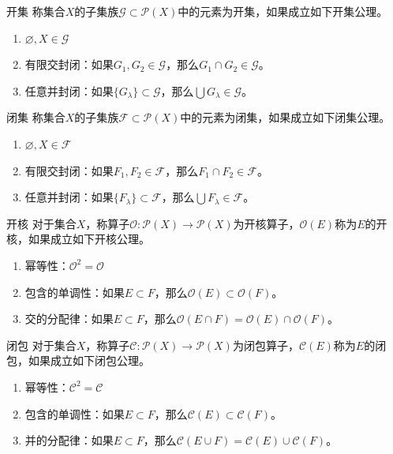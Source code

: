 \documentclass[lang = cn, scheme = chinese, thmcnt = section, usesamecnt]{elegantbook}
\newcommand{\sub}{\subset}             %
\begin{document}
\begin{definition}{开集}
	称集合$X$的子集族$\mathscr{G}\sub\mathscr{P}(X)$中的元素为开集，如果成立如下开集公理。
	\begin{enumerate}
		\item $\varnothing,X\in\mathscr{G}$
		\item 有限交封闭：如果$G_1,G_2\in\mathscr{G}$，那么$G_1\cap G_2\in\mathscr{G}$。
		\item 任意并封闭：如果$\{ G_\lambda \}\sub\mathscr{G}$，那么$\bigcup G_\lambda\in\mathscr{G}$。
	\end{enumerate}
\end{definition}

\begin{definition}{闭集}
	称集合$X$的子集族$\mathscr{F}\sub\mathscr{P}(X)$中的元素为闭集，如果成立如下闭集公理。
	\begin{enumerate}
		\item $\varnothing,X\in\mathscr{F}$
		\item 有限交封闭：如果$F_1,F_2\in\mathscr{F}$，那么$F_1\cap F_2\in\mathscr{F}$。
		\item 任意并封闭：如果$\{ F_\lambda \}\sub\mathscr{F}$，那么$\bigcup F_\lambda\in\mathscr{F}$。
	\end{enumerate}
\end{definition}

\begin{definition}{开核}
	对于集合$X$，称算子$\mathcal{O}:\mathscr{P}(X)\to\mathscr{P}(X)$为开核算子，$\mathcal{O}(E)$称为$E$的开核，如果成立如下开核公理。
	\begin{enumerate}
		\item 幂等性：$\mathcal{O}^2=\mathcal{O}$
		\item 包含的单调性：如果$E\sub F$，那么$\mathcal{O}(E)\sub \mathcal{O}(F)$。
		\item 交的分配律：如果$E\sub F$，那么$\mathcal{O}(E\cap F)=\mathcal{O}(E)\cap \mathcal{O}(F)$。
	\end{enumerate}
\end{definition}

\begin{definition}{闭包}
	对于集合$X$，称算子$\mathcal{C}:\mathscr{P}(X)\to\mathscr{P}(X)$为闭包算子，$\mathcal{C}(E)$称为$E$的闭包，如果成立如下闭包公理。
	\begin{enumerate}
		\item 幂等性：$\mathcal{C}^2=\mathcal{C}$
		\item 包含的单调性：如果$E\sub F$，那么$\mathcal{C}(E)\sub \mathcal{C}(F)$。
		\item 并的分配律：如果$E\sub F$，那么$\mathcal{C}(E\cup F)=\mathcal{C}(E)\cup \mathcal{C}(F)$。
	\end{enumerate}
\end{definition}
\end{document}
